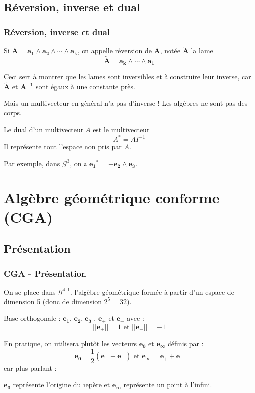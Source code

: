 \documentclass{beamer}
\newcommand{\e}[1]{\bm{e_{#1}}}
\newcommand{\ei}{\e{\infty}}
\begin{document}
\subsection{Réversion, inverse et dual}
\begin{frame}
\frametitle{Réversion, inverse et dual}
Si $\bm{A} = \bm{a_1}  \wedge \bm{a_2} \wedge \cdots \wedge \bm{a_k}$, on appelle réversion de $\bm{A}$, notée $\tilde{\bm{A}}$ la lame $$\tilde{\bm{A}} =  \bm{a_k} \wedge \cdots \wedge \bm{a_1}$$


Ceci sert à montrer que les lames sont inversibles et à construire leur inverse, car $\tilde{\bm{A}}$ et $\bm{A^{-1}}$ sont égaux à une constante près. 
\pause

Mais un multivecteur en général n'a pas d'inverse ! Les algèbres ne sont pas des corps. 

\pause
Le dual d'un multivecteur $A$ est le multivecteur $$A^* = AI^{-1}$$
Il représente tout l'espace non pris par $A$.
\pause

Par exemple, dans $\mathscr{G}^3$, on a $\bm{e_{1}}^* =  -\bm{e_2} \wedge \bm{e_3}$.

\end{frame}

\section{Algèbre géométrique conforme (CGA)}
\subsection{Présentation}
\begin{frame}
\frametitle{CGA - Présentation}
\pause
On se place dans $\mathscr{G}^{4,1}$, l'algèbre géométrique formée à partir d'un espace de dimension 5 (donc de dimension $2^5=32$). 

Base orthogonale : $\bm{e_1}$, $\bm{e_2} $,  $\bm{e_3}$ , $\bm{e_+}$ et $\bm{e_-}$ avec  : 
$$||\bm{e_+}|| = 1 \text{ et } ||\bm{e_-}|| = -1$$ \pause

En pratique, on utilisera plutôt les vecteurs $\bm{e_0}$ et $\ei$ définis par : 
$$ \bm{e_0} = \frac{1}{2} (\bm{e_-} - \bm{e_+}) \text{ et }  \ei = \bm{e_+}+ \bm{e_-}$$
car plus parlant : 

$\bm{e_0}$ représente l'origine du repère et $\ei$ représente un point à l'infini.

\end{frame}
\end{document}
